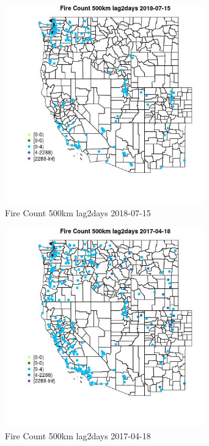\begin{figure} 
\centering  
\includegraphics[width=0.77\textwidth]{Code_Outputs/Report_ML_input_PM25_Step4_part_e_de_duplicated_aves_compiled_2019-05-20wNAs_MapObsFire_Count_500km_lag2days2018-07-15.jpg} 
\caption{\label{fig:Report_ML_input_PM25_Step4_part_e_de_duplicated_aves_compiled_2019-05-20wNAsMapObsFire_Count_500km_lag2days2018-07-15}Fire Count 500km lag2days 2018-07-15} 
\end{figure} 
 

\begin{figure} 
\centering  
\includegraphics[width=0.77\textwidth]{Code_Outputs/Report_ML_input_PM25_Step4_part_e_de_duplicated_aves_compiled_2019-05-20wNAs_MapObsFire_Count_500km_lag2days2017-04-18.jpg} 
\caption{\label{fig:Report_ML_input_PM25_Step4_part_e_de_duplicated_aves_compiled_2019-05-20wNAsMapObsFire_Count_500km_lag2days2017-04-18}Fire Count 500km lag2days 2017-04-18} 
\end{figure} 
 


